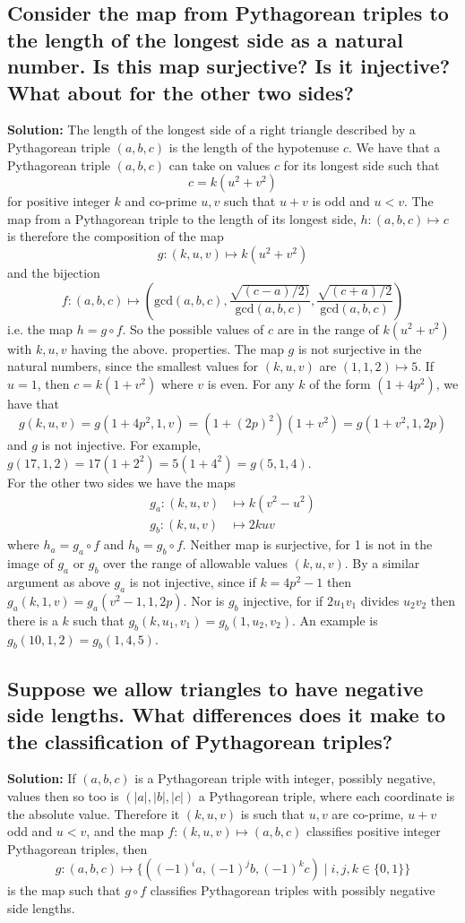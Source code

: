 \documentclass{article}
\newcommand{\exercise}[1]{\subsection{\normalfont #1}}
\newcommand{\solution}{\indent\indent \textbf{Solution: }}
\begin{document}
\exercise{Consider the map from Pythagorean triples to the length of the longest side as a natural number. Is this map surjective? Is it injective? What about for the other two sides?}
\solution
The length of the longest side of a right triangle described by a Pythagorean triple $(a,b,c)$ is the length of the hypotenuse $c$. We have that a Pythagorean triple $(a, b, c)$ can take on values $c$ for its longest side such that 
$$c = k(u^2 + v^2)$$
for positive integer $k$ and co-prime $u, v$ such that $u + v$ is odd and $u < v$. The map from a Pythagorean triple to the length of its longest side, $h \colon (a,b,c) \mapsto c$ is therefore the composition of the map 
$$g\colon (k, u, v) \mapsto k(u^2 + v^2)$$
and the bijection 
$$f\colon (a,b,c) \mapsto \left(\text{gcd}(a,b,c), \frac{\sqrt{(c-a)/2)}}{\text{gcd}(a,b,c)} , \frac{\sqrt{(c+a)/2}}{\text{gcd}(a,b,c)}\right)$$
i.e. the map $h = g \circ f$. So the possible values of $c$ are in the range of $k(u^2 + v^2)$ with $k, u, v$ having the above. properties. The map $g$ is not surjective in the natural numbers, since the smallest values for $(k, u, v)$ are $(1, 1, 2) \mapsto 5$. If $u=1$, then $c=k(1 + v^2)$ where $v$ is even. For any $k$ of the form $(1 + 4p^2)$, we have that 
$$g(k, u, v) = g(1 + 4p^2, 1, v) = (1+(2p)^2)(1+v^2) = g(1+v^2, 1, 2p)$$
and $g$ is not injective. For example, $g(17, 1, 2) = 17(1+2^2) = 5(1+4^2) = g(5, 1, 4)$.  \\
\indent For the other two sides we have the maps 
\begin{align*}
g_a\colon (k, u, v) &\mapsto  k(v^2 - u^2) \\
g_b\colon  (k,u,v)  &\mapsto  2kuv
\end{align*}
where $h_a = g_a \circ f$ and $h_b = g_b \circ f$. Neither map is surjective, for 1 is not in the image of $g_a$ or $g_b$ over the range of allowable values $(k,u,v)$. By a similar argument as above $g_a$ is not injective, since if $k = 4p^2 -1$ then $g_a(k,1,v) = g_a(v^2-1, 1, 2p)$. Nor is $g_b$ injective, for if $2u_1v_1$ divides $u_2v_2$ then there is a $k$ such that $g_b(k,u_1,v_1) = g_b(1, u_2, v_2)$. An example is $g_b(10,1,2) = g_b(1,4,5)$.  

\exercise{Suppose we allow triangles to have negative side lengths. What differences does it make to the classification of Pythagorean triples?}
\solution
If $(a, b, c)$ is a Pythagorean triple with integer, possibly negative, values then so too is $(|a|, |b|, |c|)$ a Pythagorean triple, where each coordinate is the absolute value. Therefore it $(k, u, v)$ is such that $u, v$ are co-prime, $u+v$ odd and $u<v$, and the map $f\colon (k, u ,v) \mapsto (a,b,c)$ classifies positive integer Pythagorean triples, then
$$g: (a, b, c) \mapsto \{( (-1)^ia, (-1)^jb, (-1)^kc) \mid i, j, k \in \{0,1\}\}$$ 
is the map such that $g\circ f$ classifies Pythagorean triples with possibly negative side lengths. 
\end{document}

